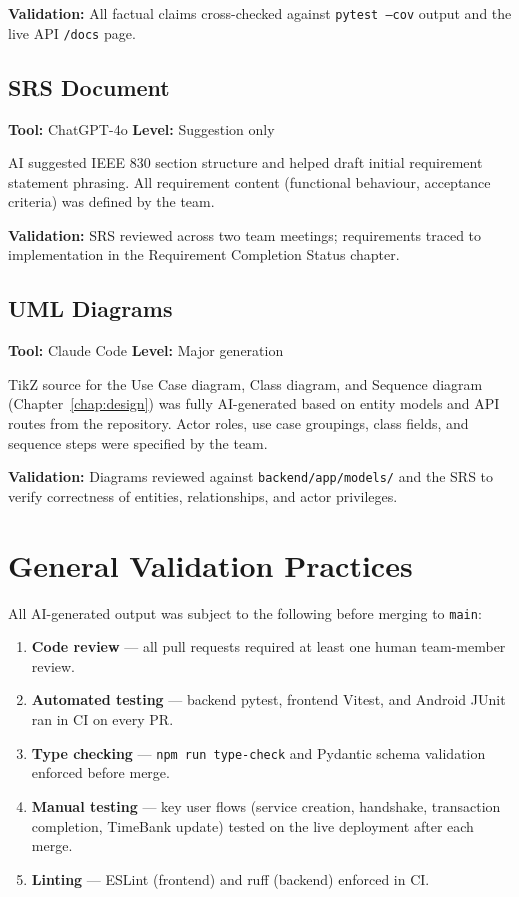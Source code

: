 \documentclass[11pt,a4paper]{report}
\begin{document}
\textbf{Validation:} All factual claims cross-checked against \texttt{pytest --cov} output and the live API \texttt{/docs} page.

\subsection{SRS Document}

\textbf{Tool:} ChatGPT-4o \quad \textbf{Level:} Suggestion only

AI suggested IEEE 830 section structure and helped draft initial requirement statement phrasing. All requirement content (functional behaviour, acceptance criteria) was defined by the team.

\textbf{Validation:} SRS reviewed across two team meetings; requirements traced to implementation in the Requirement Completion Status chapter.

\subsection{UML Diagrams}

\textbf{Tool:} Claude Code \quad \textbf{Level:} Major generation

TikZ source for the Use Case diagram, Class diagram, and Sequence diagram (Chapter~\ref{chap:design}) was fully AI-generated based on entity models and API routes from the repository. Actor roles, use case groupings, class fields, and sequence steps were specified by the team.


\textbf{Validation:} Diagrams reviewed against \texttt{backend/app/models/} and the SRS to verify correctness of entities, relationships, and actor privileges.

\section{General Validation Practices}

All AI-generated output was subject to the following before merging to \texttt{main}:

\begin{enumerate}
    \item \textbf{Code review} --- all pull requests required at least one human team-member review.
    \item \textbf{Automated testing} --- backend pytest, frontend Vitest, and Android JUnit ran in CI on every PR.
    \item \textbf{Type checking} --- \texttt{npm run type-check} and Pydantic schema validation enforced before merge.
    \item \textbf{Manual testing} --- key user flows (service creation, handshake, transaction completion, TimeBank update) tested on the live deployment after each merge.
    \item \textbf{Linting} --- ESLint (frontend) and ruff (backend) enforced in CI.
\end{enumerate}
\end{document}
